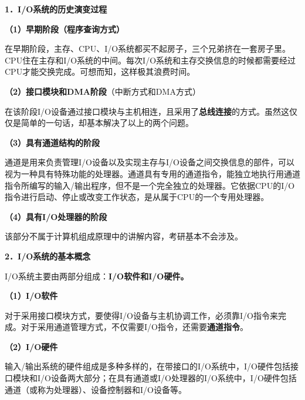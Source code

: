 {\textbf{1．I/O系统的历史演变过程}}

\textbf{（1）早期阶段（程序查询方式）}

在早期阶段，主存、CPU、I/O系统都买不起房子，三个兄弟挤在一套房子里。CPU住在主存和I/O系统的中间。每次I/O系统和主存交换信息的时候都需要经过CPU才能交换完成。可想而知，这样极其浪费时间。

\textbf{（2）接口模块和DMA阶段}（中断方式和DMA方式）

在该阶段I/O设备通过接口模块与主机相连，且采用了\textbf{总线连接}的方式。虽然这仅仅是简单的一句话，却基本解决了以上的两个问题。

\textbf{（3）具有通道结构的阶段}

通道是用来负责管理I/O设备以及实现主存与I/O设备之间交换信息的部件，可以视为一种具有特殊功能的处理器。通道具有专用的通道指令，能独立地执行用通道指令所编写的输入/输出程序，但不是一个完全独立的处理器。它依据CPU的I/O指令进行启动、停止或改变工作状态，是从属于CPU的一个专用处理器。

\textbf{（4）具有I/O处理器的阶段}

该部分不属于计算机组成原理中的讲解内容，考研基本不会涉及。

\textbf{{2．I/O系统的基本概念}}

I/O系统主要由两部分组成：\textbf{I/O软件和I/O硬件。}

\textbf{（1）I/O软件}

对于采用接口模块方式，要使得I/O设备与主机协调工作，必须靠I/O指令来完成。对于采用通道管理方式，不仅需要I/O指令，还需要\textbf{通道指令}。

\textbf{（2）I/O硬件}

输入/输出系统的硬件组成是多种多样的，在带接口的I/O系统中，I/O硬件包括接口模块和I/O设备两大部分；在具有通道或I/O处理器的I/O系统中，I/O硬件包括通道（或称为处理器）、设备控制器和I/O设备等。\\

